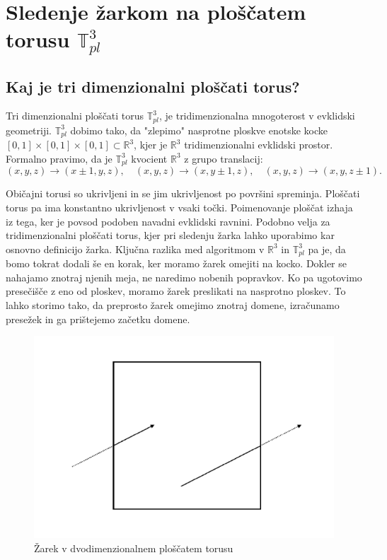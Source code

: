\documentclass[titlepage]{article}
\begin{document}
\section{Sledenje žarkom na ploščatem torusu \(\mathbb{T}_{pl}^{3}\)} 
\subsection{Kaj je tri dimenzionalni ploščati torus?}
Tri dimenzionalni ploščati torus \( \mathbb{T}^3_{pl} \), je tridimenzionalna mnogoterost v evklidski geometriji. \( \mathbb{T}^3_{pl} \) dobimo tako, da "zlepimo" nasprotne ploskve enotske kocke \([0,1] \times [0,1] \times [0,1] \subset \mathbb{R}^3 \), kjer je \(\mathbb{R}^3\) tridimenzionalni evklidski prostor. Formalno pravimo, da je \( \mathbb{T}^3_{pl} \) kvocient \(\mathbb{R}^3\) z grupo translacij:
\[
(x, y, z) \to (x \pm 1, y, z), \quad (x, y, z) \to (x, y \pm 1, z), \quad (x, y, z) \to (x, y, z \pm 1).
\]

Običajni torusi so ukrivljeni in se jim ukrivljenost po površini spreminja. Ploščati torus pa ima konstantno ukrivljenost v vsaki točki. Poimenovanje ploščat izhaja iz tega, ker je povsod podoben navadni evklidski ravnini. Podobno velja za tridimenzionalni ploščati torus, kjer pri sledenju žarka lahko uporabimo kar osnovno definicijo žarka. Ključna razlika med algoritmom v \( \mathbb{R}^3 \) in \( \mathbb{T}^3_{pl} \) pa je, da bomo tokrat dodali še en korak, ker moramo žarek omejiti na kocko. Dokler se nahajamo znotraj njenih meja, ne naredimo nobenih popravkov. Ko pa ugotovimo presečišče z eno od ploskev, moramo žarek preslikati na nasprotno ploskev. To lahko storimo tako, da preprosto žarek omejimo znotraj domene, izračunamo presežek in ga prištejemo začetku domene.

\begin{figure}[H]
    \centering
    \includegraphics[width=0.5\linewidth]{Images/flat_torus_zrcaljenje.png}
    \caption{Žarek v dvodimenzionalnem ploščatem torusu}
    \label{Slika:Žarek v dvodimenzionalnem ploščatem torusu}
\end{figure}
\end{document}
